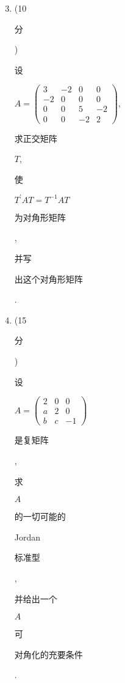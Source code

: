 \documentclass[10pt]{article}
\begin{document}
\begin{enumerate}
  \setcounter{enumi}{2}
  \item (10 \begin{CJK}{UTF8}{mj}分\end{CJK}) \begin{CJK}{UTF8}{mj}设\end{CJK} $A=\left(\begin{array}{cccc}3 & -2 & 0 & 0 \\ -2 & 0 & 0 & 0 \\ 0 & 0 & 5 & -2 \\ 0 & 0 & -2 & 2\end{array}\right)$, \begin{CJK}{UTF8}{mj}求正交矩阵\end{CJK} $T$, \begin{CJK}{UTF8}{mj}使\end{CJK} $T^{\prime} A T=T^{-1} A T$ \begin{CJK}{UTF8}{mj}为对角形矩阵\end{CJK}, \begin{CJK}{UTF8}{mj}并写\end{CJK} \begin{CJK}{UTF8}{mj}出这个对角形矩阵\end{CJK}.

  \item (15 \begin{CJK}{UTF8}{mj}分\end{CJK}) \begin{CJK}{UTF8}{mj}设\end{CJK} $A=\left(\begin{array}{ccc}2 & 0 & 0 \\ a & 2 & 0 \\ b & c & -1\end{array}\right)$ \begin{CJK}{UTF8}{mj}是复矩阵\end{CJK}, \begin{CJK}{UTF8}{mj}求\end{CJK} $A$ \begin{CJK}{UTF8}{mj}的一切可能的\end{CJK} Jordan \begin{CJK}{UTF8}{mj}标准型\end{CJK}, \begin{CJK}{UTF8}{mj}并给出一个\end{CJK} $A$ \begin{CJK}{UTF8}{mj}可\end{CJK} \begin{CJK}{UTF8}{mj}对角化的充要条件\end{CJK}.


\end{enumerate}
\end{document}
